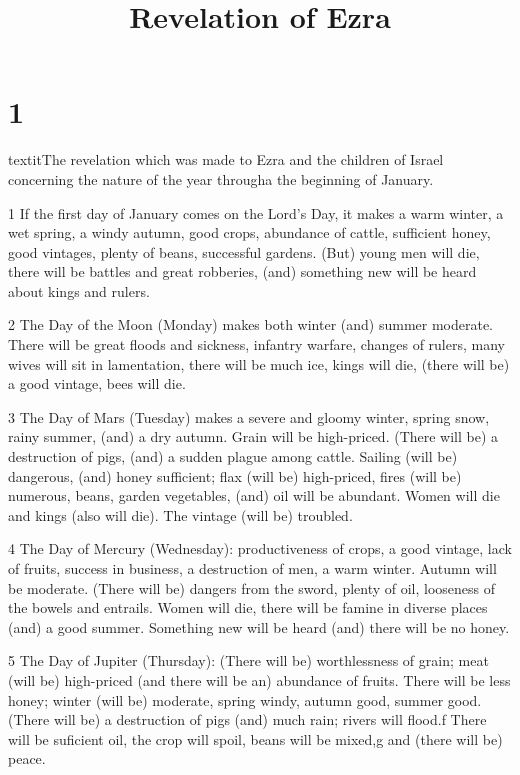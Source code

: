 

\title{Revelation of Ezra}

\chapter{1}

\par textit{The revelation which was made to Ezra and the children of Israel concerning the nature of the year througha the beginning of January.}

\par 1 If the first day of January comes on the Lord's Day, it makes a warm winter, a wet spring, a windy autumn, good crops, abundance of cattle, sufficient honey, good vintages, plenty of beans, successful gardens. (But) young men will die, there will be battles and great robberies, (and) something new will be heard about kings and rulers.

\par 2 The Day of the Moon (Monday) makes both winter (and) summer moderate. There will be great floods and sickness, infantry warfare, changes of rulers, many wives will sit in lamentation, there will be much ice, kings will die, (there will be) a good vintage, bees will die.

\par 3 The Day of Mars (Tuesday) makes a severe and gloomy winter, spring snow, rainy summer, (and) a dry autumn. Grain will be high-priced. (There will be) a destruction of pigs, (and) a sudden plague among cattle. Sailing (will be) dangerous, (and) honey sufficient; flax (will be) high-priced, fires (will be) numerous, beans, garden vegetables, (and) oil will be abundant. Women will die and kings (also will die). The vintage (will be) troubled.

\par 4 The Day of Mercury (Wednesday): productiveness of crops, a good vintage, lack of fruits, success in business, a destruction of men, a warm winter. Autumn will be moderate. (There will be) dangers from the sword, plenty of oil, looseness of the bowels and entrails. Women will die, there will be famine in diverse places (and) a good summer. Something new will be heard (and) there will be no honey.

\par 5 The Day of Jupiter (Thursday): (There will be) worthlessness of grain; meat (will be) high-priced (and there will be an) abundance of fruits. There will be less honey; winter (will be) moderate, spring windy, autumn good, summer good. (There will be) a destruction of pigs (and) much rain; rivers will flood.f There will be suficient oil, the crop will spoil, beans will be mixed,g and (there will be) peace.


